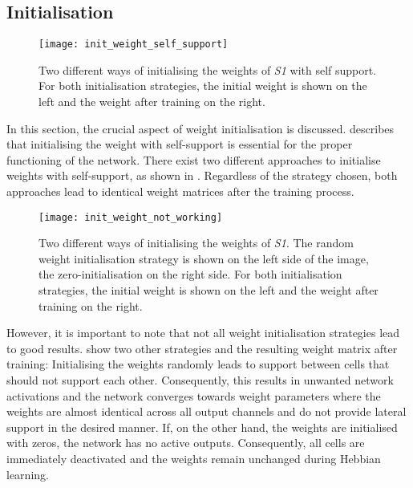 \subsection{Initialisation}
\begin{figure}[h]
    \centering
    \texttt{[image: init\_weight\_self\_support]}
    \caption[Weight initialisation with self-support]{Two different ways of initialising the weights of \emph{S1} with self support. For both initialisation strategies, the initial weight is shown on the left and the weight after training on the right.}
\end{figure}

In this section, the crucial aspect of weight initialisation is discussed.
 describes that initialising the weight with self-support is essential for the proper functioning of the network.
There exist two different approaches to initialise weights with self-support, as shown in .
Regardless of the strategy chosen, both approaches lead to identical weight matrices after the training process.

\begin{figure}[h]
    \centering
    \texttt{[image: init\_weight\_not\_working]}
    \caption[Random weight initialisation]{Two different ways of initialising the weights of \emph{S1}. The random weight initialisation strategy is shown on the left side of the image, the zero-initialisation on the right side. For both initialisation strategies, the initial weight is shown on the left and the weight after training on the right.}
\end{figure}

However, it is important to note that not all weight initialisation strategies lead to good results. 
 show two other strategies and the resulting weight matrix after training:
Initialising the weights randomly leads to support between cells that should not support each other.
Consequently, this results in unwanted network activations and the network converges towards weight parameters where the weights are almost identical across all output channels and do not provide lateral support in the desired manner.
If, on the other hand, the weights are initialised with zeros, the network has no active outputs. Consequently, all cells are immediately deactivated and the weights remain unchanged during Hebbian learning.

